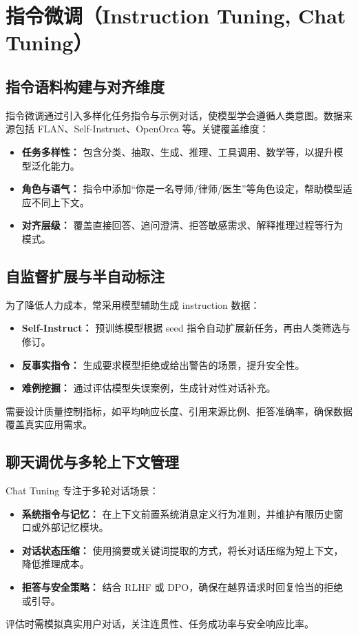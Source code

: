 \documentclass[UTF8,zihao=-4]{ctexart}
\begin{document}
\section{指令微调（Instruction Tuning, Chat Tuning）}
\subsection{指令语料构建与对齐维度}
指令微调通过引入多样化任务指令与示例对话，使模型学会遵循人类意图。数据来源包括 FLAN、Self-Instruct、OpenOrca 等。关键覆盖维度：
\begin{itemize}
  \item \textbf{任务多样性：} 包含分类、抽取、生成、推理、工具调用、数学等，以提升模型泛化能力。
  \item \textbf{角色与语气：} 指令中添加“你是一名导师/律师/医生”等角色设定，帮助模型适应不同上下文。
  \item \textbf{对齐层级：} 覆盖直接回答、追问澄清、拒答敏感需求、解释推理过程等行为模式。
\end{itemize}

\subsection{自监督扩展与半自动标注}
为了降低人力成本，常采用模型辅助生成 instruction 数据：
\begin{itemize}
  \item \textbf{Self-Instruct：} 预训练模型根据 seed 指令自动扩展新任务，再由人类筛选与修订。
  \item \textbf{反事实指令：} 生成要求模型拒绝或给出警告的场景，提升安全性。
  \item \textbf{难例挖掘：} 通过评估模型失误案例，生成针对性对话补充。
\end{itemize}
需要设计质量控制指标，如平均响应长度、引用来源比例、拒答准确率，确保数据覆盖真实应用需求。

\subsection{聊天调优与多轮上下文管理}
Chat Tuning 专注于多轮对话场景：
\begin{itemize}
  \item \textbf{系统指令与记忆：} 在上下文前置系统消息定义行为准则，并维护有限历史窗口或外部记忆模块。
  \item \textbf{对话状态压缩：} 使用摘要或关键词提取的方式，将长对话压缩为短上下文，降低推理成本。
  \item \textbf{拒答与安全策略：} 结合 RLHF 或 DPO，确保在越界请求时回复恰当的拒绝或引导。
\end{itemize}
评估时需模拟真实用户对话，关注连贯性、任务成功率与安全响应比率。
\end{document}
